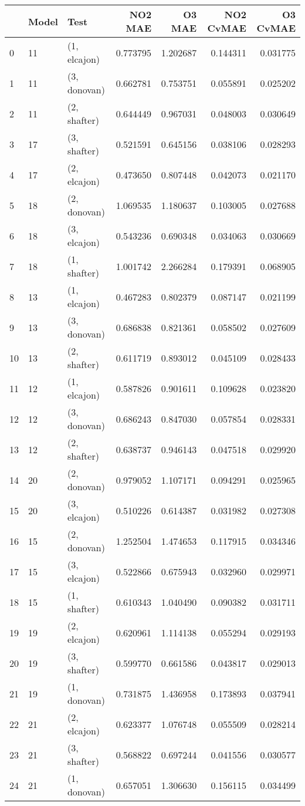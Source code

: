 \begin{tabular}{lllrrrr}
\toprule
{} & Model &          Test &   NO2 MAE &    O3 MAE &  NO2 CvMAE &  O3 CvMAE \\
\midrule
0  &    11 &  (1, elcajon) &  0.773795 &  1.202687 &   0.144311 &  0.031775 \\
1  &    11 &  (3, donovan) &  0.662781 &  0.753751 &   0.055891 &  0.025202 \\
2  &    11 &  (2, shafter) &  0.644449 &  0.967031 &   0.048003 &  0.030649 \\
3  &    17 &  (3, shafter) &  0.521591 &  0.645156 &   0.038106 &  0.028293 \\
4  &    17 &  (2, elcajon) &  0.473650 &  0.807448 &   0.042073 &  0.021170 \\
5  &    18 &  (2, donovan) &  1.069535 &  1.180637 &   0.103005 &  0.027688 \\
6  &    18 &  (3, elcajon) &  0.543236 &  0.690348 &   0.034063 &  0.030669 \\
7  &    18 &  (1, shafter) &  1.001742 &  2.266284 &   0.179391 &  0.068905 \\
8  &    13 &  (1, elcajon) &  0.467283 &  0.802379 &   0.087147 &  0.021199 \\
9  &    13 &  (3, donovan) &  0.686838 &  0.821361 &   0.058502 &  0.027609 \\
10 &    13 &  (2, shafter) &  0.611719 &  0.893012 &   0.045109 &  0.028433 \\
11 &    12 &  (1, elcajon) &  0.587826 &  0.901611 &   0.109628 &  0.023820 \\
12 &    12 &  (3, donovan) &  0.686243 &  0.847030 &   0.057854 &  0.028331 \\
13 &    12 &  (2, shafter) &  0.638737 &  0.946143 &   0.047518 &  0.029920 \\
14 &    20 &  (2, donovan) &  0.979052 &  1.107171 &   0.094291 &  0.025965 \\
15 &    20 &  (3, elcajon) &  0.510226 &  0.614387 &   0.031982 &  0.027308 \\
16 &    15 &  (2, donovan) &  1.252504 &  1.474653 &   0.117915 &  0.034346 \\
17 &    15 &  (3, elcajon) &  0.522866 &  0.675943 &   0.032960 &  0.029971 \\
18 &    15 &  (1, shafter) &  0.610343 &  1.040490 &   0.090382 &  0.031711 \\
19 &    19 &  (2, elcajon) &  0.620961 &  1.114138 &   0.055294 &  0.029193 \\
20 &    19 &  (3, shafter) &  0.599770 &  0.661586 &   0.043817 &  0.029013 \\
21 &    19 &  (1, donovan) &  0.731875 &  1.436958 &   0.173893 &  0.037941 \\
22 &    21 &  (2, elcajon) &  0.623377 &  1.076748 &   0.055509 &  0.028214 \\
23 &    21 &  (3, shafter) &  0.568822 &  0.697244 &   0.041556 &  0.030577 \\
24 &    21 &  (1, donovan) &  0.657051 &  1.306630 &   0.156115 &  0.034499 \\
\bottomrule
\end{tabular}
